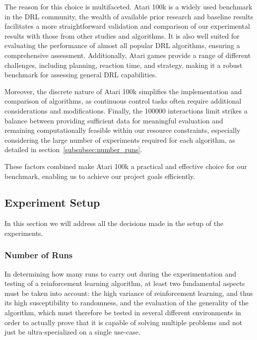 The reason for this choice is multifaceted. Atari 100k is a widely used benchmark in the DRL community, the wealth of available prior research and baseline results facilitates a more straightforward validation and comparison of our experimental results with those from other studies and algorithms. It is also well suited for evaluating the performance of almost all popular DRL algorithms, ensuring a comprehensive assessment. Additionally, Atari games provide a range of different challenges, including planning, reaction time, and strategy, making it a robust benchmark for assessing general DRL capabilities.

Moreover, the discrete nature of Atari 100k simplifies the implementation and comparison of algorithms, as continuous control tasks often require additional considerations and modifications. Finally, the \num{100000} interactions limit strikes a balance between providing sufficient data for meaningful evaluation and remaining computationally feasible within our resource constraints, especially considering the large number of experiments required for each algorithm, as detailed in section~\vref{subsubsec:number_runs}.

These factors combined make Atari 100k a practical and effective choice for our benchmark, enabling us to achieve our project goals efficiently.


\subsection{Experiment Setup}
\label{subsec:experiment_setup}
In this section we will address all the decisions made in the setup of the experiments.

\subsubsection{Number of Runs}
\label{subsubsec:number_runs}

In determining how many runs to carry out during the experimentation and testing of a reinforcement learning algorithm, at least two fundamental aspects must be taken into account: the high variance of reinforcement learning, and thus its high susceptibility to randomness, and the evaluation of the generality of the algorithm, which must therefore be tested in several different environments in order to actually prove that it is capable of solving multiple problems and not just be ultra-specialized on a single use-case.

